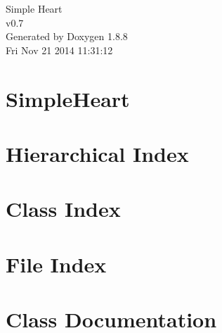 \documentclass[twoside]{book}
\newcommand{\+}{\discretionary{\mbox{\scriptsize$\hookleftarrow$}}{}{}}
\newcommand{\clearemptydoublepage}{%
  \newpage{\pagestyle{empty}\cleardoublepage}%
}
\begin{document}
\hypersetup{pageanchor=false,
             bookmarks=true,
             bookmarksnumbered=true,
             pdfencoding=unicode
            }
\begin{titlepage}
\vspace*{7cm}
\begin{center}%
{\Large Simple Heart \\[1ex]\large v0.\+7 }\\
\vspace*{1cm}
{\large Generated by Doxygen 1.8.8}\\
\vspace*{0.5cm}
{\small Fri Nov 21 2014 11:31:12}\\
\end{center}
\end{titlepage}
\clearemptydoublepage
\tableofcontents
\clearemptydoublepage
{}
\hypersetup{pageanchor=true}

\chapter{Simple\+Heart}
\label{md__r_e_a_d_m_e}
\hypertarget{md__r_e_a_d_m_e}{}

\chapter{Hierarchical Index}

\chapter{Class Index}

\chapter{File Index}

\chapter{Class Documentation}









































\end{document}
